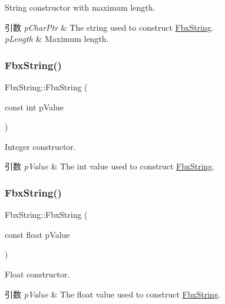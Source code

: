 String constructor with maximum length. 
\begin{DoxyParams}{引数}
{\em p\+Char\+Ptr} & The string used to construct \hyperlink{class_fbx_string}{Fbx\+String}. \\
\hline
{\em p\+Length} & Maximum length. \\
\hline
\end{DoxyParams}
\mbox{\label{class_fbx_string_a8db1298a9f9580d2511fa28ac8cd2f0f}} 
\subsubsection{\texorpdfstring{Fbx\+String()}{FbxString()}\hspace{0.1cm}{\footnotesize\ttfamily [6/8]}}
{\footnotesize\ttfamily Fbx\+String\+::\+Fbx\+String (\begin{DoxyParamCaption}\item[{const int}]{p\+Value }\end{DoxyParamCaption})}

Integer constructor. 
\begin{DoxyParams}{引数}
{\em p\+Value} & The int value used to construct \hyperlink{class_fbx_string}{Fbx\+String}. \\
\hline
\end{DoxyParams}
\mbox{\label{class_fbx_string_ada766330be76ca59b423fbb11adf2181}} 
\subsubsection{\texorpdfstring{Fbx\+String()}{FbxString()}\hspace{0.1cm}{\footnotesize\ttfamily [7/8]}}
{\footnotesize\ttfamily Fbx\+String\+::\+Fbx\+String (\begin{DoxyParamCaption}\item[{const float}]{p\+Value }\end{DoxyParamCaption})}

Float constructor. 
\begin{DoxyParams}{引数}
{\em p\+Value} & The float value used to construct \hyperlink{class_fbx_string}{Fbx\+String}. \\
\hline
\end{DoxyParams}
\mbox{\label{class_fbx_string_a9430a89dc9eac29f35291de87491691b}} 
